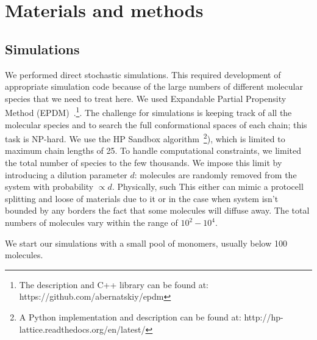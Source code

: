 \documentclass[journal=jacsat,manuscript=article,layout=twocolumn]{achemso}
\begin{document}
\section{Materials and methods}
\label{sec:mat}
\subsection{Simulations\label{sec:mat-sim}}
We performed direct stochastic simulations.  This required development of appropriate simulation 
code because of the large numbers of different molecular species that we need to treat here.  We 
used Expandable Partial Propensity Method (EPDM)~\cite{Guseva2016b}.\footnote{The description and 
C++ library can be found at: https://github.com/abernatskiy/epdm}. The challenge for simulations is 
keeping track of all the molecular species and to search the full conformational spaces of each 
chain; this task is NP-hard.  We use the HP Sandbox 
algorithm~\cite{lau1989lattice,Dill2008}\footnote{A Python implementation and description can be 
found at: http://hp-lattice.readthedocs.org/en/latest/}), which is limited to maximum chain lengths 
of 25.  To handle computational constraints, we limited the total number of species to the few 
thousands.  We impose this limit by introducing a dilution parameter $d$: molecules are randomly 
removed from the system with probability $\propto d$.  Physically, such This either can mimic a 
protocell splitting and loose of materials due to it or in the case when system isn't bounded by any 
borders the fact that some molecules will diffuse away. The total numbers of molecules vary within 
the range of $10^2-10^4$.

We start our simulations with a small pool of monomers, usually below 100 molecules. 
\end{document}
